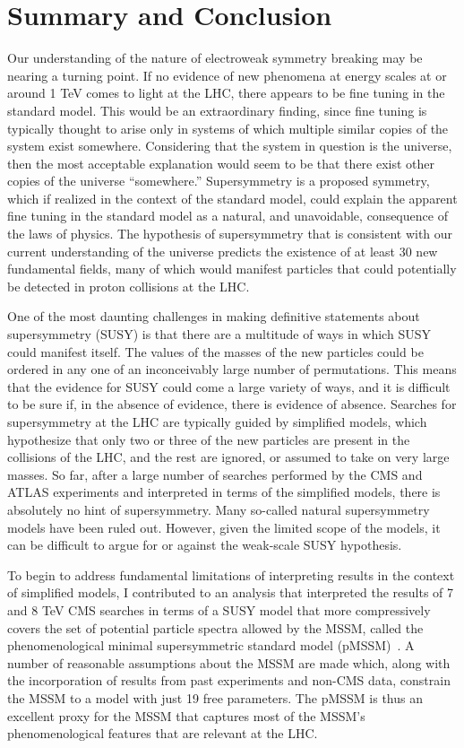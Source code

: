 \chapter{Summary and Conclusion}
Our understanding of the nature of electroweak symmetry breaking may be nearing a turning point. If no evidence of new phenomena at energy scales at or around 1 TeV comes to light at the LHC, there appears to be fine tuning in the standard model. This would be an extraordinary finding, since fine tuning is typically thought to arise only in systems of which multiple similar copies of the system exist somewhere. Considering that the system in question is the universe, then the most acceptable explanation would seem to be that there exist other copies of the universe ``somewhere.'' Supersymmetry is a proposed symmetry, which if realized in the context of the standard model, could explain the apparent fine tuning in the standard model as a natural, and unavoidable, consequence of the laws of physics. The hypothesis of supersymmetry that is consistent with our current understanding of the universe predicts the existence of at least 30 new fundamental fields, many of which would manifest particles that could potentially be detected in proton collisions at the LHC. 

One of the most daunting challenges in making definitive statements about supersymmetry (SUSY) is that there are a multitude of ways in which SUSY could manifest itself. The values of the masses of the new particles could be ordered in any one of an inconceivably large number of permutations. This means that the evidence for SUSY could come a large variety of ways, and it is difficult to be sure if, in the absence of evidence, there is evidence of absence. Searches for supersymmetry at the LHC are typically guided by simplified models, which hypothesize that only two or three of the new particles are present in the collisions of the LHC, and the rest are ignored, or assumed to take on very large masses. So far, after a large number of searches performed by the CMS and ATLAS experiments and interpreted in terms of the simplified models, there is absolutely no hint of supersymmetry. Many so-called natural supersymmetry models have been ruled out. However, given the limited scope of the models, it can be difficult to argue for or against the weak-scale SUSY hypothesis.

To begin to address fundamental limitations of interpreting results in the context of simplified models, I contributed to an analysis that interpreted the results of 7 and 8 TeV CMS searches in terms of a SUSY model that more compressively covers the set of potential particle spectra allowed by the MSSM, called the phenomenological minimal supersymmetric standard model (pMSSM)~\cite{Khachatryan:2016nvf}. A number of reasonable assumptions about the MSSM are made which, along with the incorporation of results from past experiments and non-CMS data, constrain the MSSM to a model with just 19 free parameters. The pMSSM is thus an excellent proxy for the MSSM that captures most of the MSSM's phenomenological features that are relevant at the LHC. 

